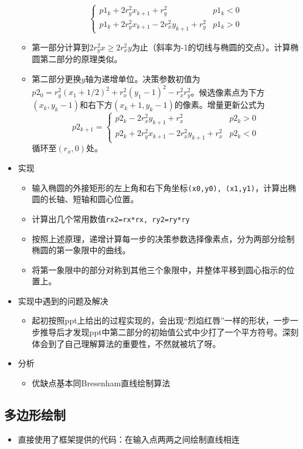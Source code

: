 \documentclass[a4paper,UTF8]{article}
\theoremstyle{definition}
\begin{document}
\begin{itemize}
\begin{itemize}
$$\begin{cases}
      p1_k+2r_y^2x_{k+1}+r_y^2 & p1_k < 0\\
      p1_k+2r_y^2x_{k+1}-2r_x^2y_{k+1}+r_y^2 & p1_k>0
    \end{cases}$$
    \item 第一部分计算到$2r_y^2x\ge 2r_x^2y$为止（斜率为-1的切线与椭圆的交点）。计算椭圆第二部分的原理类似。
    \item 第二部分更换$y$轴为递增单位。决策参数初值为$p2_0=r_y^2(x_1+1/2)^2+r_x^2(y_1-1)^2-r_x^2r_y^2$。候选像素点为下方$(x_k, y_k-1)$和右下方$(x_k+1,y_k-1)$的像素。增量更新公式为
    $$p2_{k+1}=\begin{cases}
      p2_k-2r_x^2y_{k+1}+r_x^2 & p2_k>0\\
      p2_k+2r_y^2x_{k+1}-2r_x^2y_{k+1}+r_x^2 & p2_k<0
    \end{cases}$$
    循环至$(r_x,0)$处。
  \end{itemize}
  \item 实现
  \begin{itemize}
    \item 输入椭圆的外接矩形的左上角和右下角坐标\texttt{(x0,y0), (x1,y1)}，计算出椭圆的长轴、短轴和圆心位置。
    \item 计算出几个常用数值\texttt{rx2=rx*rx, ry2=ry*ry}
    \item 按照上述原理，递增计算每一步的决策参数选择像素点，分为两部分绘制椭圆的第一象限中的曲线。
    \item 将第一象限中的部分对称到其他三个象限中，并整体平移到圆心指示的位置上。
  \end{itemize}
  \item 实现中遇到的问题及解决
  \begin{itemize}
    \item 起初按照ppt上给出的过程实现的，会出现“烈焰红唇”一样的形状，一步一步推导后才发现ppt中第二部分的初始值公式中少打了一个平方符号。深刻体会到了自己理解算法的重要性，不然就被坑了呀。
  \end{itemize}
  \item 分析
  \begin{itemize}
    \item 优缺点基本同Bresenham直线绘制算法
  \end{itemize}
\end{itemize}
\subsection{多边形绘制}
\begin{itemize}
  \item 直接使用了框架提供的代码：在输入点两两之间绘制直线相连
\end{itemize}
\end{document}
